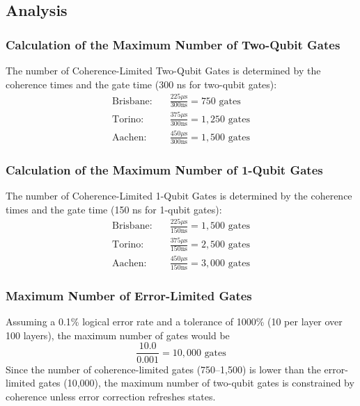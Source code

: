 \documentclass[conference,twoside]{IEEEtran}
\begin{document}
\subsection{Analysis}

\subsubsection{Calculation of the Maximum Number of Two-Qubit Gates}
The number of Coherence-Limited Two-Qubit Gates is determined by the coherence times and the gate time (300 ns for two-qubit gates):
\begin{align*}
\text{Brisbane:} \quad & \frac{225 \mu\text{s} }{300 \text{ns}} = 750 \text{ gates} \\
\text{Torino:} \quad & \frac{375 \mu\text{s}}{300 \text{ns}} = 1,250 \text{ gates} \\
\text{Aachen:} \quad & \frac{450 \mu\text{s}}{300 \text{ns}} = 1,500 \text{ gates}
\end{align*}

\subsubsection{Calculation of the Maximum Number of 1-Qubit Gates}
The number of Coherence-Limited 1-Qubit Gates is determined by the coherence times and the gate time (150 ns for 1-qubit gates):
\begin{align*}
\text{Brisbane:} \quad & \frac{225 \mu\text{s} }{150 \text{ns}} = 1,500 \text{ gates} \\
\text{Torino:} \quad & \frac{375 \mu\text{s} }{150 \text{ns}} = 2,500 \text{ gates} \\
\text{Aachen:} \quad & \frac{450 \mu\text{s} }{150 \text{ns}} = 3,000 \text{ gates}
\end{align*}

\subsubsection{Maximum Number of Error-Limited Gates}
Assuming a 0.1\% logical error rate and a tolerance of 1000\% (10 per layer over 100 layers), the maximum number of gates would be 
\[
\frac{10.0}{0.001} = 10,000 \text{ gates}
\]
Since the number of coherence-limited gates (750--1,500) is lower than the error-limited gates (10,000), the maximum number of two-qubit gates is constrained by coherence unless error correction refreshes states. 
\end{document}
